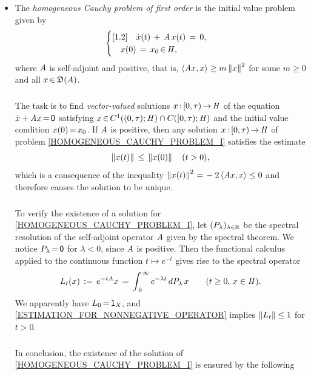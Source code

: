 \documentclass[11pt,twoside]{article}
\begin{document}
\begin{itemize}[leftmargin=12pt,itemsep=2mm,topsep=1mm]
\item[1.]
The \textit{homogeneous Cauchy problem of first order}
is the initial value problem given by
\begin{equation}\label{HOMOGENEOUS_CAUCHY_PROBLEM_I}
\begin{cases}[1.2]
\quad \dot{x}(t) \,+\, \mathit{A} \, x(t) \,=\, 0,\\ 
\quad x(0) \,=\, x_0 {\,\in\,} \mathit{H},\\
\end{cases}
\end{equation}
where $\mathit{A}$ is self-adjoint and positive,
that is,
$\langle \mathit{A} x,x \rangle \geq m \left\lVert x \right\rVert^2$
for some $m \geq 0$ and all $x {\,\in\,} \mathfrak{D}(\mathit{A})$.

\subparagraph{} %
The task is to find \textit{vector-valued} solutions $x {\,:\,} [0,\tau) {\,\to\,} \mathit{H}$
of the equation $\dot{x} + \mathit{A} x {\,=\,} {\mathsf{0}}$ 
satisfying $x {\,\in\,} C^1((0,\tau);\mathit{H}) \cap C([0,\tau);\mathit{H})$ and
the initial value condition $x(0) {\,=\,} x_0$.
If $\mathit{A}$ is positive,
then any solution $x{\,:\,}[0,\tau) {\,\to\,} \mathit{H}$
of problem \eqref{HOMOGENEOUS_CAUCHY_PROBLEM_I} satisfies the estimate
\begin{equation}\label{ESTIMATION_FOR_NONNEGATIVE_OPERATOR}
\left\lVert x(t) \right\rVert \, \leq \, \left\lVert x(0) \right\rVert
\quad (t > 0),
\end{equation}
which is a consequence of the inequality
$\left\lVert x(t) \right\rVert^2 {\,=\,} - 2 \, \langle \mathit{A} x,x \rangle \leq 0$
and therefore causes the solution to be unique.

\subparagraph{}
To verify the existence of a solution for \eqref{HOMOGENEOUS_CAUCHY_PROBLEM_I},
let $(P_{\lambda})_{\lambda \in {\mathbb{R}}}$ be the spectral resolution
of the self-adjoint operator $\mathit{A}$ given by the spectral theorem.
We notice $P_{\lambda} {\,=\,} {\mathsf{0}}$ for $\lambda < 0$,
since $\mathit{A}$ is positive.
Then the functional calculus applied to the continuous function
$t \mapsto e^{-t}$ gives rise to the spectral operator
\[
{L}_t(x)
\,:=\,
e^{-t \mathit{A}} x
\,=\,
\int_{\,0}^{\,\infty} e^{-\lambda t} \, dP_{\lambda} \, x
\quad \quad (t \geq 0, \, x \in \mathit{H}).
\]
We apparently have ${L}_0 {\,=\,} {\mathsf{1}}_{\mathit{X}}$,
and \eqref{ESTIMATION_FOR_NONNEGATIVE_OPERATOR} implies
$\left\lVert {L}_t \right\rVert \leq 1$ for $t > 0$.

\subparagraph{} %
In conclusion,
the existence of the solution of \eqref{HOMOGENEOUS_CAUCHY_PROBLEM_I}
is ensured by the following


\end{itemize}
\end{document}
